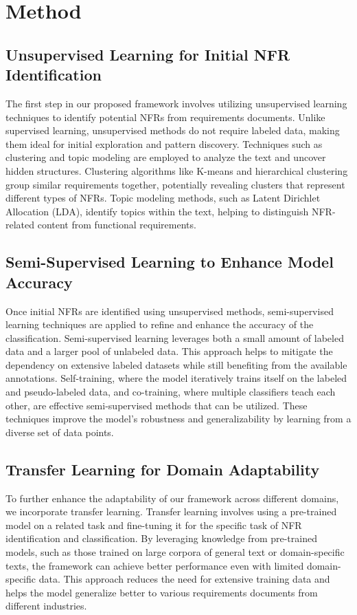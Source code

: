 \documentclass[sigconf,natbib=false]{acmart}
\begin{document}
\section{Method}

\subsection{Unsupervised Learning for Initial NFR Identification}
The first step in our proposed framework involves utilizing unsupervised learning techniques to identify potential NFRs from requirements documents. Unlike supervised learning, unsupervised methods do not require labeled data, making them ideal for initial exploration and pattern discovery. Techniques such as clustering and topic modeling are employed to analyze the text and uncover hidden structures. Clustering algorithms like K-means and hierarchical clustering group similar requirements together, potentially revealing clusters that represent different types of NFRs. Topic modeling methods, such as Latent Dirichlet Allocation (LDA), identify topics within the text, helping to distinguish NFR-related content from functional requirements.

\subsection{Semi-Supervised Learning to Enhance Model Accuracy}
Once initial NFRs are identified using unsupervised methods, semi-supervised learning techniques are applied to refine and enhance the accuracy of the classification. Semi-supervised learning leverages both a small amount of labeled data and a larger pool of unlabeled data. This approach helps to mitigate the dependency on extensive labeled datasets while still benefiting from the available annotations. Self-training, where the model iteratively trains itself on the labeled and pseudo-labeled data, and co-training, where multiple classifiers teach each other, are effective semi-supervised methods that can be utilized. These techniques improve the model’s robustness and generalizability by learning from a diverse set of data points.

\subsection{Transfer Learning for Domain Adaptability}
To further enhance the adaptability of our framework across different domains, we incorporate transfer learning. Transfer learning involves using a pre-trained model on a related task and fine-tuning it for the specific task of NFR identification and classification. By leveraging knowledge from pre-trained models, such as those trained on large corpora of general text or domain-specific texts, the framework can achieve better performance even with limited domain-specific data. This approach reduces the need for extensive training data and helps the model generalize better to various requirements documents from different industries.
\end{document}
